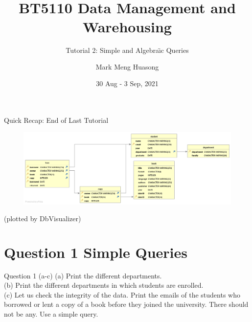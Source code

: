 \title{BT5110 Data Management and Warehousing}

\subtitle{Tutorial 2: Simple and Algebra\"{\i}c Queries}

\author{Mark Meng Huasong}



\date{30 Aug - 3 Sep, 2021}

\begin{frame}
	\titlepage
\end{frame}

\begin{frame}[fragile]{Quick Recap: End of Last Tutorial}
	\begin{figure}
		\includegraphics[width=1\textwidth]{t1/images/t1-end.png}
	\end{figure}
	(plotted by DbVisualizer)
\end{frame}

\section*{Question 1 Simple Queries}

\begin{frame}[fragile]{Question 1 (a-c)}
	(a) Print the different departments.\\ \vspace{5pt}
	(b) Print the different departments in which students are enrolled. \\ \vspace{5pt}
	(c) Let us check the integrity of the data. Print the emails of the students who borrowed or lent a copy of a book before they joined the university. There should not be any. Use a simple query.  
\end{frame}

